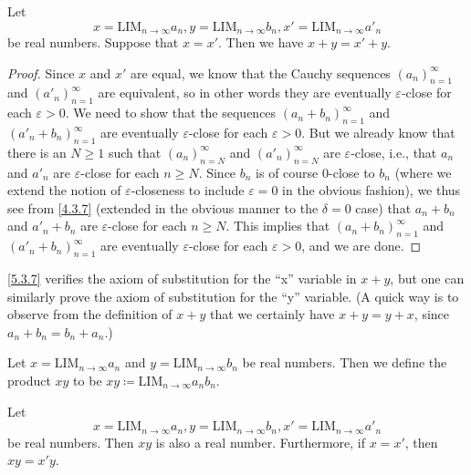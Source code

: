 \begin{lem}\label{5.3.7}
  Let
  \[
    x = \text{LIM}_{n \to \infty} a_n, y = \text{LIM}_{n \to \infty} b_n, x' = \text{LIM}_{n \to \infty} a'_n
  \]
  be real numbers.
  Suppose that \(x = x'\).
  Then we have \(x + y = x' + y\).
\end{lem}

\begin{proof}
  Since \(x\) and \(x'\) are equal, we know that the Cauchy sequences \((a_n)_{n = 1}^{\infty}\) and \((a'_n)_{n = 1}^{\infty}\) are equivalent, so in other words they are eventually \(\varepsilon\)-close for each \(\varepsilon > 0\).
  We need to show that the sequences \((a_n + b_n)_{n = 1}^{\infty}\) and \((a'_n + b_n)_{n = 1}^{\infty}\) are eventually \(\varepsilon\)-close for each \(\varepsilon > 0\).
  But we already know that there is an \(N \geq 1\) such that \((a_n)_{n = N}^{\infty}\) and \((a'_n)_{n = N}^{\infty}\) are \(\varepsilon\)-close, i.e., that \(a_n\) and \(a'_n\) are \(\varepsilon\)-close for each \(n \geq N\).
  Since \(b_n\) is of course \(0\)-close to \(b_n\) (where we extend the notion of \(\varepsilon\)-closeness to include \(\varepsilon = 0\) in the obvious fashion), we thus see from \cref{4.3.7} (extended in the obvious manner to the \(\delta = 0\) case) that \(a_n + b_n\) and \(a'_n + b_n\) are \(\varepsilon\)-close for each \(n \geq N\).
  This implies that \((a_n + b_n)_{n = 1}^{\infty}\) and \((a'_n + b_n)_{n = 1}^{\infty}\) are eventually \(\varepsilon\)-close for each \(\varepsilon > 0\), and we are done.
\end{proof}

\begin{rmk}\label{5.3.8}
  \cref{5.3.7} verifies the axiom of substitution for the ``x'' variable in \(x + y\), but one can similarly prove the axiom of substitution for the ``y'' variable.
  (A quick way is to observe from the definition of \(x + y\) that we certainly have \(x + y = y + x\), since \(a_n + b_n = b_n + a_n\).)
\end{rmk}

\begin{defn}\label{5.3.9}
  Let \(x = \text{LIM}_{n \to \infty} a_n\) and \(y = \text{LIM}_{n \to \infty} b_n\) be real numbers.
  Then we define the product \(xy\) to be \(xy \coloneqq \text{LIM}_{n \to \infty} a_n b_n\).
\end{defn}

\begin{prop}\label{5.3.10}
  Let
  \[
    x = \text{LIM}_{n \to \infty} a_n, y = \text{LIM}_{n \to \infty} b_n, x' = \text{LIM}_{n \to \infty} a'_n
  \]
  be real numbers.
  Then \(xy\) is also a real number.
  Furthermore, if \(x = x'\), then \(xy = x'y\).
\end{prop}

